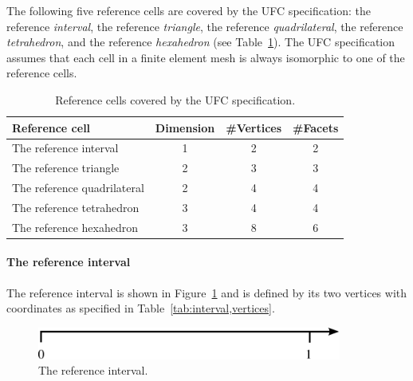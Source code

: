 
The following five reference cells are covered by the UFC specification:
the reference \emph{interval},
the reference \emph{triangle},
the reference \emph{quadrilateral},
the reference \emph{tetrahedron}, and
the reference \emph{hexahedron} (see Table~\ref{tab:ufc_reference_cells}).
The UFC specification assumes that each cell in a finite element mesh
is always isomorphic to one of the reference cells.

\begin{table}
\linespread{1.2}\selectfont
  \begin{center}
    \begin{tabular}{|l|c|c|c|}
      \hline
      Reference cell & Dimension & \#Vertices & \#Facets \\
      \hline
      \hline
      The reference interval      & 1 & 2 & 2 \\
      \hline
      The reference triangle      & 2 & 3 & 3 \\
      \hline
      The reference quadrilateral & 2 & 4 & 4 \\
      \hline
      The reference tetrahedron   & 3 & 4 & 4 \\
      \hline
      The reference hexahedron    & 3 & 8 & 6 \\
      \hline
    \end{tabular}
    \caption{Reference cells covered by the UFC specification.}
    \label{tab:ufc_reference_cells}
  \end{center}
\end{table}

\paragraph{The reference interval}

The reference interval is shown in Figure~\ref{fig:interval} and is
defined by its two vertices with coordinates as specified in
Table~\ref{tab:interval,vertices}.

\begin{figure}
  \begin{center}
    \includegraphics[width=10cm]{chapters/alnes-2/pdf/interval.pdf}
    \caption{The reference interval.}
    \label{fig:interval}
  \end{center}
\end{figure}

